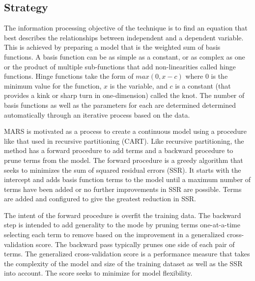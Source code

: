 \subsection{Strategy}
The information processing objective of the technique is to find an equation that best describes the relationships between independent and a dependent variable.
This is achieved by preparing a model that is the weighted sum of basis functions. A basis function can be as simple as a constant, or as complex as one or the product of multiple sub-functions that add non-linearities called hinge functions. Hinge functions take the form of $max(0, x-c)$ where $0$ is the minimum value for the function, $x$ is the variable, and $c$ is a constant (that provides a kink or sharp turn in one-dimension) called the knot. The number of basis functions as well as the parameters for each are determined determined automatically through an iterative process based on the data.

MARS is motivated as a process to create a continuous model using a procedure like that used in recursive partitioning (CART). Like recursive partitioning, the method has a forward procedure to add terms and a backward procedure to prune terms from the model.
The forward procedure is a greedy algorithm that seeks to minimizes the sum of squared residual errors (SSR). It starts with the intercept and adds basis function terms to the model until a maximum number of terms have been added or no further improvements in SSR are possible. Terms are added and configured to give the greatest reduction in SSR.

The intent of the forward procedure is overfit the training data. The backward step is intended to add generality to the mode by pruning terms one-at-a-time selecting each term to remove based on the improvement in a generalized cross-validation score. The backward pass typically prunes one side of each pair of terms.
The generalized cross-validation score is a performance measure that takes the complexity of the model and size of the training dataset as well as the SSR into account. The score seeks to minimize for model flexibility.

